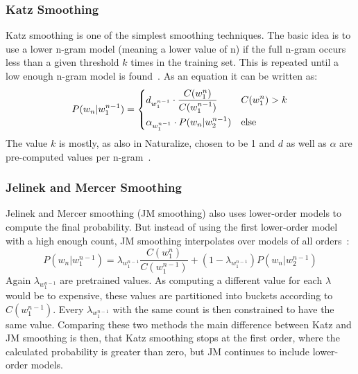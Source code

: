 \subsubsection{Katz Smoothing}
Katz smoothing is one of the simplest smoothing techniques. The basic idea is to use a lower n-gram model (meaning a lower value of n) if the full n-gram occurs less than a given threshold $k$ times in the training set. This is repeated until a low enough n-gram model is found~\cite{katz1987estimation}. As an equation it can be written as:
\begin{equation}
    P(w_n | w_1^{n-1}) = 
    \begin{dcases}
    d_{w_1^{n-1}}\cdot \frac{C(w_1^n)}{C(w_1^{n-1})} & C(w_1^n) > k\\
    \alpha_{w_1^{n-1}} \cdot P(w_n | w_2^{n-1}) & \text{else}
    \end{dcases}
\end{equation}
The value $k$ is mostly, as also in Naturalize, chosen to be 1 and $d$ as well as $\alpha$ are pre-computed values per n-gram~\cite{katz1987estimation}.
\subsubsection{Jelinek and Mercer Smoothing}
Jelinek and Mercer smoothing (JM smoothing) also uses lower-order models to compute the final probability. But instead of using the first lower-order model with a high enough count, JM smoothing interpolates over models of all orders~\cite{smoothingStudy}:
\begin{equation}
    P(w_n | w_1^{n-1})=\lambda_{w_1^{n-1}}\frac{C(w_1^n)}{C(w_1^{n-1})} + (1-\lambda_{w_1^{n-1}})P(w_n | w_2^{n-1})
\end{equation}
Again $\lambda_{w_1^{n-1}}$ are pretrained values. As computing a different value for each $\lambda$ would be to expensive, these values are partitioned into buckets according to $C(w_1^{n-1})$. Every $\lambda_{w_1^{n-1}}$ with the same count is then constrained to have the same value.
Comparing these two methods the main difference between Katz and JM smoothing is then, that Katz smoothing stops at the first order, where the calculated probability is greater than zero, but JM continues to include lower-order models.